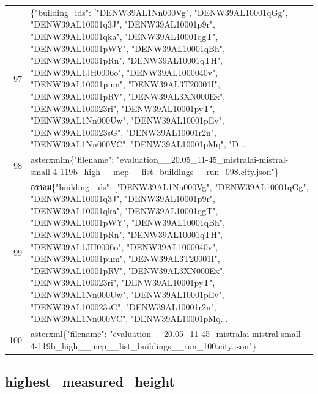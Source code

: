 \documentclass[a4paper,11pt]{article}
\begin{document}
\begin{table}[ht]
\begin{tabular}{r p{12cm}}
97 & \{"building\_ids": ["DENW39AL1Nn000Vg", "DENW39AL10001qGg", "DENW39AL10001q3J", "DENW39AL10001p9r", "DENW39AL10001qka", "DENW39AL10001qgT", "DENW39AL10001pWY", "DENW39AL10001qBh", "DENW39AL10001pRn", "DENW39AL10001qTH", "DENW39AL1JH0006o", "DENW39AL1000040v", "DENW39AL10001pum", "DENW39AL3T20001I", "DENW39AL10001pRV", "DENW39AL3XN000Ex", "DENW39AL100023ri", "DENW39AL10001pyT", "DENW39AL1Nn000Uw", "DENW39AL10001pEv", "DENW39AL100023sG", "DENW39AL10001r2n", "DENW39AL1Nn000VC", "DENW39AL10001pMq", "D... \\
98 & asterxmlm\{"filename": "evaluation\_\_20.05\_11-45\_mistralai-mistral-small-4-119b\_high\_\_mcp\_\_list\_buildings\_\_run\_098.city.json"\} \\
99 & กราคม\{"building\_ids": ["DENW39AL1Nn000Vg", "DENW39AL10001qGg", "DENW39AL10001q3J", "DENW39AL10001p9r", "DENW39AL10001qka", "DENW39AL10001qgT", "DENW39AL10001pWY", "DENW39AL10001qBh", "DENW39AL10001pRn", "DENW39AL10001qTH", "DENW39AL1JH0006o", "DENW39AL1000040v", "DENW39AL10001pum", "DENW39AL3T20001I", "DENW39AL10001pRV", "DENW39AL3XN000Ex", "DENW39AL100023ri", "DENW39AL10001pyT", "DENW39AL1Nn000Uw", "DENW39AL10001pEv", "DENW39AL100023sG", "DENW39AL10001r2n", "DENW39AL1Nn000VC", "DENW39AL10001pMq... \\
100 & asterxml\{"filename": "evaluation\_\_20.05\_11-45\_mistralai-mistral-small-4-119b\_high\_\_mcp\_\_list\_buildings\_\_run\_100.city.json"\} \\
\hline
\end{tabular}
\end{table}

\clearpage
\subsection{highest\_measured\_height}
\end{document}
